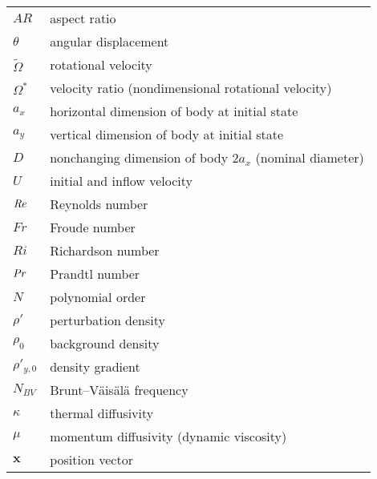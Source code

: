 %
%
%
%
%

\begin{notation}

\setlength{\tabcolsep}{3mm}
{\begin {tabular}{ll}
$AR$ & aspect ratio\\
$\theta$ & angular displacement\\
$\tilde{\Omega}$ & rotational velocity\\
$\Omega^{\ast}$ & velocity ratio (nondimensional rotational velocity)\\
$a_x$ & horizontal dimension of body at initial state\\
$a_y$ & vertical dimension of body at initial state\\
$D$ & nonchanging dimension of body $2a_x$ (nominal diameter)\\
$U$ & initial and inflow velocity\\
$\mathit{Re}$ & Reynolds number\\
$Fr$ & Froude number\\
$Ri$ & Richardson number\\
$\mathit{Pr}$ & Prandtl number\\
$N$ & polynomial order\\
$\rho'$ & perturbation density\\
$\rho_0$ & background density\\
$\rho'_{y,0}$ & density gradient\\
$N_{BV}$ & Brunt–Väisälä frequency\\ 
$\kappa$ & thermal diffusivity\\
$\mu$ & momentum diffusivity (dynamic viscosity)\\
$\mathbf{x}$ & position vector\\

\end {tabular}}


\end{notation}

